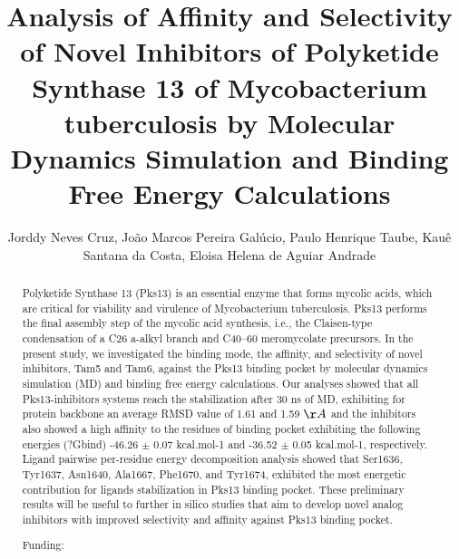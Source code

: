 \documentclass[twoside]{article}
\title{\vspace{-15mm}\fontsize{24pt}{10pt}\selectfont\textbf{ Analysis of Affinity and Selectivity of Novel Inhibitors of Polyketide Synthase 13 of Mycobacterium tuberculosis by Molecular Dynamics Simulation and Binding Free Energy Calculations }} %
\author{ Jorddy Neves Cruz, Jo\~ao Marcos Pereira Gal\'ucio, Paulo Henrique Taube, Kau\^e Santana da Costa, Eloisa Helena de Aguiar Andrade }
\affil{ Museu Paraense Emilio Goeldi,  Botany Coordination. Adolpho Ducke Laboratory,  Bel\'em,  Par\'a Brazil. }
\date{}
\begin{document}
  
  
  \maketitle %
  
  
  \thispagestyle{fancy} %
  
  
  \begin{abstract}
  Polyketide Synthase 13 (Pks13) is an essential enzyme that forms mycolic acids,  which are critical for viability and virulence of Mycobacterium tuberculosis. Pks13 performs the final assembly step of the mycolic acid synthesis,  i.e.,  the Claisen-type condensation of a C26 a-alkyl branch and C40–60 meromycolate precursors. In the present study,  we investigated the binding mode,  the affinity,  and selectivity of novel inhibitors,  Tam5 and Tam6,  against the Pks13 binding pocket by molecular dynamics simulation (MD) and binding free energy calculations. Our analyses showed that all Pks13-inhibitors systems reach the stabilization after 30 ns of MD,  exhibiting for protein backbone an average RMSD value of 1.61 and 1.59 $\AA$ and the inhibitors also showed a high affinity to the residues of binding pocket exhibiting the following energies (?Gbind) -46.26 $\pm$ 0.07 kcal.mol-1 and -36.52 $\pm$ 0.05 kcal.mol-1,  respectively. Ligand pairwise per-residue energy decomposition analysis showed that Ser1636,  Tyr1637,  Asn1640,  Ala1667,  Phe1670,  and Tyr1674,  exhibited the most energetic contribution for ligands stabilization in Pks13 binding pocket. These preliminary results will be useful to further in silico studies that aim to develop novel analog inhibitors with improved selectivity and affinity against Pks13 binding pocket.
  
  Funding:  \\ 
  \end{abstract}
  
\end{document}
